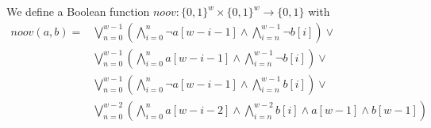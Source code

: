 \begin{definition}
    We define a Boolean function $noov: \{0,1\}^w \times \{0,1\}^w \rightarrow \{0,1\}$ with
    \label{def:refinement_approach:bvmul:noov}
    \begin{align*}
        noov\left(a, b\right)
        = &\bigvee\limits_{n=0}^{w-1}
            \left(
            \bigwedge\limits_{i=0}^{n} \neg a[w-i-1]
            \land
            \bigwedge\limits_{i=n}^{w-1} \neg b[i]
            \right) \lor\\
            &\bigvee\limits_{n=0}^{w-1}
            \left(
            \bigwedge\limits_{i=0}^{n} a[w-i-1]
            \land
            \bigwedge\limits_{i=n}^{w-1} \neg b[i]
            \right) \lor\\
            &\bigvee\limits_{n=0}^{w-1}
            \left(
            \bigwedge\limits_{i=0}^{n} \neg a[w-i-1]
            \land
            \bigwedge\limits_{i=n}^{w-1} b[i]
            \right) \lor\\
            &\bigvee\limits_{n=0}^{w-2}
            \left(
            \bigwedge\limits_{i=0}^{n} a[w-i-2]
            \land
            \bigwedge\limits_{i=n}^{w-2} b[i]
            \land a[w-1]
            \land b[w-1]
            \right)
    \end{align*}
\end{definition}


